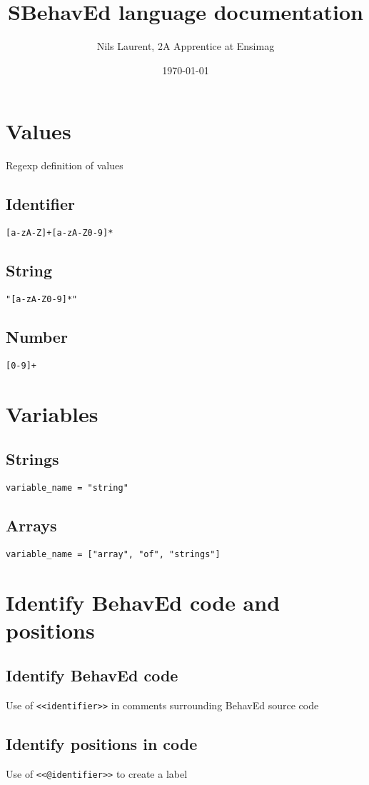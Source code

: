 \documentclass{article}
\title{SBehavEd language documentation}
\author{Nils Laurent, 2A Apprentice at Ensimag}
\date{\today}
\begin{document}
\maketitle

\section{Values}
Regexp definition of values
\subsection{Identifier}
\texttt{[a-zA-Z]+[a-zA-Z0-9]*}
\subsection{String}
\texttt{"[a-zA-Z0-9]*"}
\subsection{Number}
\texttt{[0-9]+}


\section{Variables}
\subsection{Strings}
\begin{lstlisting}
variable_name = "string"
\end{lstlisting}
\subsection{Arrays}
\begin{lstlisting}
variable_name = ["array", "of", "strings"]
\end{lstlisting}

\newpage
\section{Identify BehavEd code and positions}
\subsection{Identify BehavEd code}
Use of \texttt{<<identifier>>} in comments surrounding BehavEd source code
\subsection{Identify positions in code}
Use of \texttt{<<@identifier>>} to create a label
\end{document}
